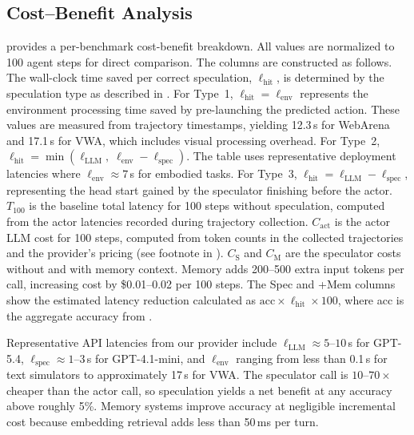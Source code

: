 \documentclass{article}
\begin{document}
\subsection{Cost--Benefit Analysis}
\label{app:cost}



 provides a per-benchmark cost-benefit breakdown. All values are normalized to 100 agent steps for direct comparison. The columns are constructed as follows. The wall-clock time saved per correct speculation, $\ell_{\text{hit}}$, is determined by the speculation type as described in . For Type~1, $\ell_{\text{hit}} = \ell_{\text{env}}$ represents the environment processing time saved by pre-launching the predicted action. These values are measured from trajectory timestamps, yielding 12.3\,s for WebArena and 17.1\,s for VWA, which includes visual processing overhead. For Type~2, $\ell_{\text{hit}} = \min(\ell_{\text{LLM}},\; \ell_{\text{env}} - \ell_{\text{spec}})$. The table uses representative deployment latencies where $\ell_{\text{env}} \approx 7$\,s for embodied tasks. For Type~3, $\ell_{\text{hit}} = \ell_{\text{LLM}} - \ell_{\text{spec}}$, representing the head start gained by the speculator finishing before the actor. $T_{100}$ is the baseline total latency for 100 steps without speculation, computed from the actor latencies recorded during trajectory collection. $C_{\text{act}}$ is the actor LLM cost for 100 steps, computed from token counts in the collected trajectories and the provider's pricing (see footnote in ). $C_{\text{S}}$ and $C_{\text{M}}$ are the speculator costs without and with memory context. Memory adds 200--500 extra input tokens per call, increasing cost by \$0.01--0.02 per 100 steps. The Spec and +Mem columns show the estimated latency reduction calculated as $\text{acc} \times \ell_{\text{hit}} \times 100$, where acc is the aggregate accuracy from .

Representative API latencies from our provider include $\ell_{\text{LLM}} \approx 5\text{--}10$\,s for GPT-5.4, $\ell_{\text{spec}} \approx 1\text{--}3$\,s for GPT-4.1-mini, and $\ell_{\text{env}}$ ranging from less than 0.1\,s for text simulators to approximately 17\,s for VWA. The speculator call is $10\text{--}70\times$ cheaper than the actor call, so speculation yields a net benefit at any accuracy above roughly 5\%. Memory systems improve accuracy at negligible incremental cost because embedding retrieval adds less than 50\,ms per turn.
\end{document}
